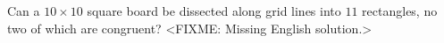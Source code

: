 \problem
Can a $10\times 10$ square board be dissected along grid lines into $11$
rectangles, no two of which are congruent?
\solution
<FIXME: Missing English solution.>
\endproblem
